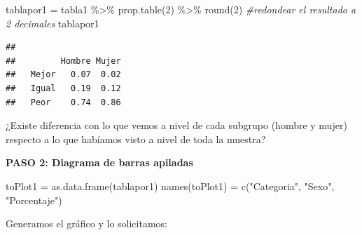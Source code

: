 \documentclass[
]{article}
\newenvironment{Shaded}{\begin{snugshade}}{\end{snugshade}}
\newcommand{\CommentTok}[1]{\textcolor[rgb]{0.56,0.35,0.01}{\textit{#1}}}
\newcommand{\DecValTok}[1]{\textcolor[rgb]{0.00,0.00,0.81}{#1}}
\newcommand{\FunctionTok}[1]{\textcolor[rgb]{0.00,0.00,0.00}{#1}}
\newcommand{\NormalTok}[1]{#1}
\newcommand{\OtherTok}[1]{\textcolor[rgb]{0.56,0.35,0.01}{#1}}
\newcommand{\SpecialCharTok}[1]{\textcolor[rgb]{0.00,0.00,0.00}{#1}}
\newcommand{\StringTok}[1]{\textcolor[rgb]{0.31,0.60,0.02}{#1}}
\begin{document}
\begin{Shaded}
\begin{Highlighting}[]
\NormalTok{tablapor1 }\OtherTok{=}\NormalTok{ tabla1 }\SpecialCharTok{\%\textgreater{}\%}
           \FunctionTok{prop.table}\NormalTok{(}\DecValTok{2}\NormalTok{) }\SpecialCharTok{\%\textgreater{}\%}  
           \FunctionTok{round}\NormalTok{(}\DecValTok{2}\NormalTok{) }\CommentTok{\#redondear el resultado a 2 decimales}
\NormalTok{tablapor1}
\end{Highlighting}
\end{Shaded}

\begin{verbatim}
##        
##         Hombre Mujer
##   Mejor   0.07  0.02
##   Igual   0.19  0.12
##   Peor    0.74  0.86
\end{verbatim}

¿Existe diferencia con lo que vemos a nivel de cada subgrupo (hombre y
mujer) respecto a lo que habíamos visto a nivel de toda la muestra?

\textbf{PASO 2: Diagrama de barras apiladas}

\begin{Shaded}
\begin{Highlighting}[]
\NormalTok{toPlot1 }\OtherTok{=} \FunctionTok{as.data.frame}\NormalTok{(tablapor1) }
\FunctionTok{names}\NormalTok{(toPlot1) }\OtherTok{=} \FunctionTok{c}\NormalTok{(}\StringTok{"Categoria"}\NormalTok{, }\StringTok{"Sexo"}\NormalTok{, }\StringTok{"Porcentaje"}\NormalTok{)}
\end{Highlighting}
\end{Shaded}

Generamos el gráfico y lo solicitamos:
\end{document}
